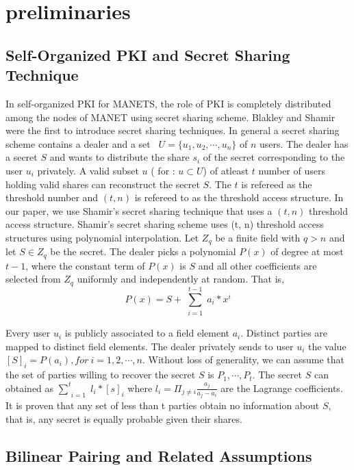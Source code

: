 \documentclass[11pt,a4paper]{llncs}
\begin{document}
\section{preliminaries}

\subsection{Self-Organized PKI and Secret Sharing Technique}

In self-organized PKI for MANETS, the role of PKI is completely distributed among the nodes of MANET using secret sharing scheme\cite{shamir}. Blakley \cite{blakley} and Shamir \cite{shamir} were the first to introduce secret sharing techniques. In general a secret sharing scheme contains a dealer and a set \ $U= \{ {u_1,u_2,\cdots,u_n} \} $ of $n$ users. The dealer has a secret $S$ and wants to distribute the share $s_i$ of the  secret corresponding  to the  user $u_i$ privately. A valid subset  $u$ ( for : $u \subset U $) of atleast $t$ number of users holding valid shares can reconstruct the secret $S$. The $t$ is refereed as the threshold number and $(t,n)$ is refereed to as the threshold  access structure\cite{shamir}. In our paper, we use Shamir's secret sharing technique that uses a $(t,n)$ threshold access structure\cite{shamir}. Shamir's secret sharing scheme uses (t, n) threshold access structures using polynomial interpolation. Let $Z_q$ be a finite field with $q > n$ and let $S \in Z_q$ be the secret. The dealer picks a polynomial $P(x)$ of degree at most $t-1$, where the constant term of $P(x)$ is $S$ and all other coefficients are selected from $Z_q$ uniformly and independently at random. That is,
$$P(x)=S+ \sum_{\substack{i=1}}^{t-1}a_i*x^i$$

Every user $u_i$ is publicly associated to a field element $a_i$. Distinct parties are mapped to distinct field elements. The dealer privately sends  to user $u_i$ the value $[S]_i = P(a_i), for\ i = 1,2,\cdots, n$. Without loss of generality, we can assume that the set of parties willing to recover the secret $S$ is ${P_1,\cdots, P_t }$. The secret $S$ can obtained as $\sum_{\substack{i=1}}^{t}l_i*[s]_i$ where $l_i=\Pi_{j\neq i}\frac{a_j}{a_j-a_i}$ are the Lagrange coefficients. It is proven that any set of less than t parties obtain no information about $S$, that is, any secret is equally probable given their shares.

\subsection{Bilinear Pairing and Related Assumptions\cite{bilinear}}
\end{document}
